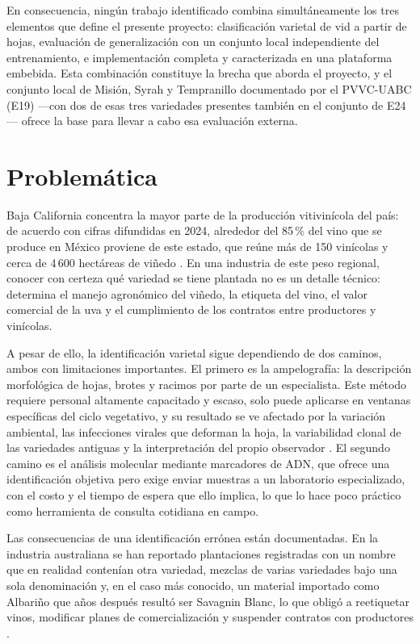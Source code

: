 En consecuencia, ningún trabajo identificado combina simultáneamente los tres
elementos que define el presente proyecto: clasificación varietal de vid a
partir de hojas, evaluación de generalización con un conjunto local
independiente del entrenamiento, e implementación completa y caracterizada en
una plataforma embebida. Esta combinación constituye la brecha que aborda el
proyecto, y el conjunto local de Misión, Syrah y Tempranillo documentado por
el PVVC-UABC (E19) —con dos de esas tres variedades presentes también en el
conjunto de E24— ofrece la base para llevar a cabo esa evaluación externa.

\section{Problemática}

Baja California concentra la mayor parte de la producción vitivinícola del
país: de acuerdo con cifras difundidas en 2024, alrededor del 85\,\% del vino
que se produce en México proviene de este estado, que reúne más de 150
vinícolas y cerca de 4\,600 hectáreas de viñedo \citep{torres2024bc}. En una
industria de este peso regional, conocer con certeza qué variedad se tiene
plantada no es un detalle técnico: determina el manejo agronómico del
viñedo, la etiqueta del vino, el valor comercial de la uva y el cumplimiento
de los contratos entre productores y vinícolas.

A pesar de ello, la identificación varietal sigue dependiendo de dos
caminos, ambos con limitaciones importantes. El primero es la ampelografía:
la descripción morfológica de hojas, brotes y racimos por parte de un
especialista. Este método requiere personal altamente capacitado y escaso,
solo puede aplicarse en ventanas específicas del ciclo vegetativo, y su
resultado se ve afectado por la variación ambiental, las infecciones virales
que deforman la hoja, la variabilidad clonal de las variedades antiguas y la
interpretación del propio observador \citep{wineaustralia2010}. El segundo
camino es el análisis molecular mediante marcadores de ADN, que ofrece una
identificación objetiva pero exige enviar muestras a un laboratorio
especializado, con el costo y el tiempo de espera que ello implica, lo que lo
hace poco práctico como herramienta de consulta cotidiana en campo.

Las consecuencias de una identificación errónea están documentadas. En la
industria australiana se han reportado plantaciones registradas con un
nombre que en realidad contenían otra variedad, mezclas de varias
variedades bajo una sola denominación y, en el caso más conocido, un
material importado como Albariño que años después resultó ser Savagnin
Blanc, lo que obligó a reetiquetar vinos, modificar planes de
comercialización y suspender contratos con productores
\citep{wineaustralia2010}.

